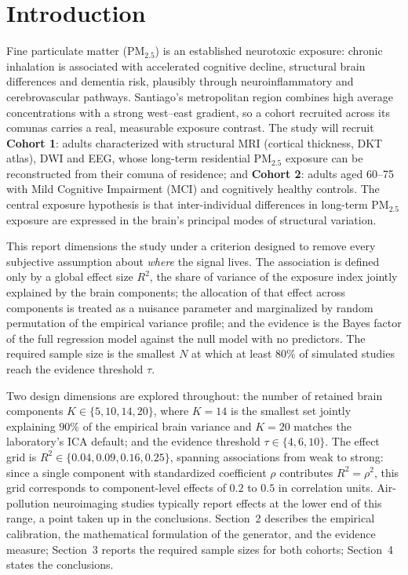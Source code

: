 \documentclass[11pt,a4paper]{article}
\newcommand{\pmf}{PM$_{2.5}$}
\begin{document}
\section{Introduction}

Fine particulate matter (\pmf) is an established neurotoxic exposure: chronic inhalation is associated with accelerated cognitive decline, structural brain differences and dementia risk, plausibly through neuroinflammatory and cerebrovascular pathways. Santiago's metropolitan region combines high average concentrations with a strong west--east gradient, so a cohort recruited across its comunas carries a real, measurable exposure contrast. The study will recruit \textbf{Cohort 1}: adults characterized with structural MRI (cortical thickness, DKT atlas), DWI and EEG, whose long-term residential \pmf{} exposure can be reconstructed from their comuna of residence; and \textbf{Cohort 2}: adults aged 60--75 with Mild Cognitive Impairment (MCI) and cognitively healthy controls. The central exposure hypothesis is that inter-individual differences in long-term \pmf{} exposure are expressed in the brain's principal modes of structural variation.

This report dimensions the study under a criterion designed to remove every subjective assumption about \emph{where} the signal lives. The association is defined only by a global effect size $R^{2}$, the share of variance of the exposure index jointly explained by the brain components; the allocation of that effect across components is treated as a nuisance parameter and marginalized by random permutation of the empirical variance profile; and the evidence is the Bayes factor of the full regression model against the null model with no predictors. The required sample size is the smallest $N$ at which at least $80\%$ of simulated studies reach the evidence threshold $\tau$.

Two design dimensions are explored throughout: the number of retained brain components $K\in\{5,10,14,20\}$, where $K=14$ is the smallest set jointly explaining $90\%$ of the empirical brain variance and $K=20$ matches the laboratory's ICA default; and the evidence threshold $\tau\in\{4,6,10\}$. The effect grid is $R^{2}\in\{0.04,0.09,0.16,0.25\}$, spanning associations from weak to strong: since a single component with standardized coefficient $\rho$ contributes $R^{2}=\rho^{2}$, this grid corresponds to component-level effects of $0.2$ to $0.5$ in correlation units. Air-pollution neuroimaging studies typically report effects at the lower end of this range, a point taken up in the conclusions. Section~2 describes the empirical calibration, the mathematical formulation of the generator, and the evidence measure; Section~3 reports the required sample sizes for both cohorts; Section~4 states the conclusions.
\end{document}
